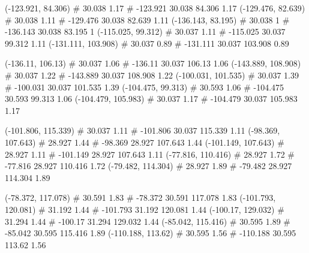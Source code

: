 \documentclass[a4paper,openbib,10pt]{article}
\newenvironment{treegraph}{\begin{graph}}{\end{graph}}
\begin{document}
\begin{treegraph}
  (-123.921, 84.306) #     30.038    1.17
   #    -123.921    30.038    84.306    1.17
  (-129.476, 82.639) #     30.038    1.11
   #    -129.476    30.038    82.639    1.11
  (-136.143, 83.195) #     30.038    1
   #    -136.143    30.038    83.195    1
  (-115.025, 99.312) #     30.037    1.11
   #    -115.025    30.037    99.312    1.11
  (-131.111, 103.908) #     30.037    0.89
   #    -131.111    30.037    103.908    0.89

  (-136.11, 106.13) #     30.037    1.06
   #    -136.11    30.037    106.13    1.06
  (-143.889, 108.908) #     30.037    1.22
   #    -143.889    30.037    108.908    1.22
  (-100.031, 101.535) #     30.037    1.39
   #    -100.031    30.037    101.535    1.39
  (-104.475, 99.313) #     30.593    1.06
   #    -104.475    30.593    99.313    1.06
  (-104.479, 105.983) #     30.037    1.17
   #    -104.479    30.037    105.983    1.17

  (-101.806, 115.339) #     30.037    1.11
   #    -101.806    30.037    115.339    1.11
  (-98.369, 107.643) #     28.927    1.44
   #    -98.369    28.927    107.643    1.44
  (-101.149, 107.643) #     28.927    1.11
   #    -101.149    28.927    107.643    1.11
  (-77.816, 110.416) #     28.927    1.72
   #    -77.816    28.927    110.416    1.72
  (-79.482, 114.304) #     28.927    1.89
   #    -79.482    28.927    114.304    1.89

  (-78.372, 117.078) #     30.591    1.83
   #    -78.372    30.591    117.078    1.83
  (-101.793, 120.081) #     31.192    1.44
   #    -101.793    31.192    120.081    1.44
  (-100.17, 129.032) #     31.294    1.44
   #    -100.17    31.294    129.032    1.44
  (-85.042, 115.416) #     30.595    1.89
   #    -85.042    30.595    115.416    1.89
  (-110.188, 113.62) #     30.595    1.56
   #    -110.188    30.595    113.62    1.56


\end{treegraph}
\end{document}
